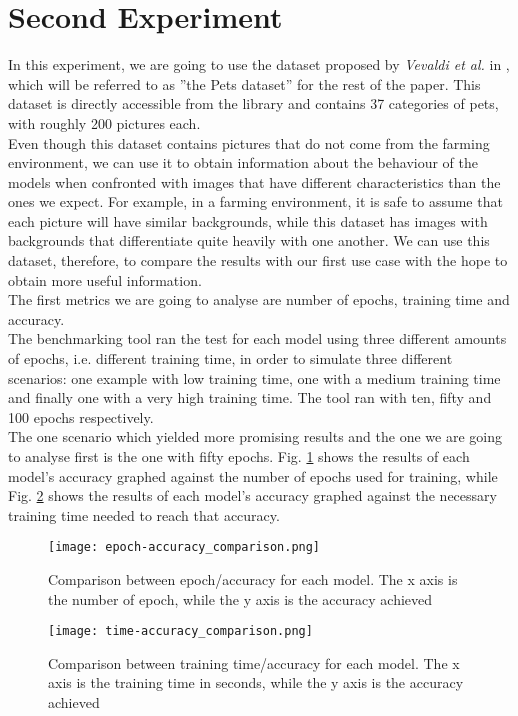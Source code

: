 \section{Second Experiment}
In this experiment, we are going to use the dataset proposed by \textit{Vevaldi et al.} in \cite{parkhi12a}, which will be referred to as ''the Pets dataset'' for the rest of the paper. This dataset is directly accessible from the library and contains 37 categories of pets, with roughly 200 pictures each. \\
Even though this dataset contains pictures that do not come from the farming environment, we can use it to obtain information about the behaviour of the models when confronted with images that have different characteristics than the ones we expect. For example, in a farming environment, it is safe to assume that each picture will have similar backgrounds, while this dataset has images with backgrounds that differentiate quite heavily with one another. We can use this dataset, therefore, to compare the results with our first use case with the hope to obtain more useful information.\\
The first metrics we are going to analyse are number of epochs, training time and accuracy.\\
The benchmarking tool ran the test for each model using three different amounts of epochs, i.e. different training time, in order to simulate three different scenarios: one example with low training time, one with a medium training time and finally one with a very high training time. The tool ran with ten, fifty and 100 epochs respectively. \\
The one scenario which yielded more promising results and the one we are going to analyse first is the one with fifty epochs. Fig. \ref{fig:com_ep_ac_models} shows the results of each model's accuracy graphed against the number of epochs used for training, while  Fig. \ref{fig:com_ti_ac_models} shows the results of each model's accuracy graphed against the necessary training time needed to reach that accuracy.\\




\begin{figure}[h]
       \centering 
	    \texttt{[image: epoch-accuracy\_comparison.png]}
        \caption[Comparison between epoch/accuracy for each model]{Comparison between epoch/accuracy for each model. The x axis is the number of epoch, while the y axis is the accuracy achieved}
         \label{fig:com_ep_ac_models}
     \end{figure}
\begin{figure}[h]
\centering 
	    \texttt{[image: time-accuracy\_comparison.png]}
        \caption[Comparison between training time/accuracy for each model]{Comparison between training time/accuracy for each model. The x axis is the training time in seconds, while the y axis is the accuracy achieved}
        \label{fig:com_ti_ac_models}
\end{figure}



